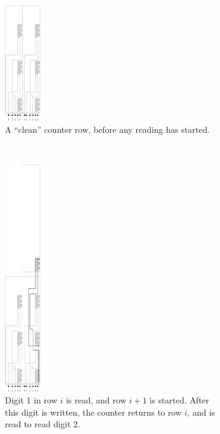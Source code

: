 \begin{figure}[H]
    \centering
    \begin{subfigure}[t]{0.2\textwidth}
        \centering
        \includegraphics[width=0.6in]{counter_read_start_general_case3_middle_level}
        \caption{\label{fig:counter_read_start_general_case3_middle_level} A ``clean'' counter row, before any reading has started.}
    \end{subfigure}%
    ~
    \begin{subfigure}[t]{0.2\textwidth}
        \centering
        \includegraphics[width=0.6in]{counter_read_digit1_return_read_digit2_general_case3_middle_level}
        \caption{\label{fig:counter_read_digit1_return_read_digit2_general_case3_middle_level} Digit 1 in row $i$ is read, and row $i + 1$ is started. After this digit is
        written, the counter returns to row $i$, and is read to read digit 2.}
    \end{subfigure}%
    ~
    \begin{subfigure}[t]{0.2\textwidth}
        \centering

\end{subfigure}
\end{figure}
